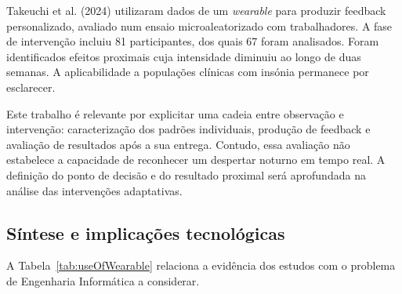 Takeuchi et al. (2024) utilizaram dados de um \textit{wearable} para produzir feedback personalizado, avaliado num ensaio microaleatorizado com trabalhadores. A fase de intervenção incluiu 81 participantes, dos quais 67 foram analisados. Foram identificados efeitos proximais cuja intensidade diminuiu ao longo de duas semanas. A aplicabilidade a populações clínicas com insónia permanece por esclarecer.

Este trabalho é relevante por explicitar uma cadeia entre observação e intervenção: caracterização dos padrões individuais, produção de feedback e avaliação de resultados após a sua entrega. Contudo, essa avaliação não estabelece a capacidade de reconhecer um despertar noturno em tempo real. A definição do ponto de decisão e do resultado proximal será aprofundada na análise das intervenções adaptativas.

\subsection{Síntese e implicações tecnológicas}
\label{sec:chap3_wearableSynthesis}

A Tabela~\ref{tab:useOfWearable} relaciona a evidência dos estudos com o problema de Engenharia Informática a considerar.


